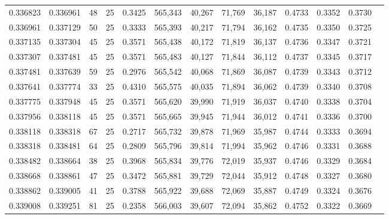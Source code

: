 \begin{tabular}{rrrrrrrrrrrrr}
0.336823 & 0.336961 &    48 &  25 &                                     0.3425 & 565,343 &  40,267 &  71,769 &  36,187 & 0.4733 & 0.3352 & 0.3730 \\
0.336961 & 0.337129 &    50 &  25 &                                     0.3333 & 565,393 &  40,217 &  71,794 &  36,162 & 0.4735 & 0.3350 & 0.3725 \\
0.337135 & 0.337304 &    45 &  25 &                                     0.3571 & 565,438 &  40,172 &  71,819 &  36,137 & 0.4736 & 0.3347 & 0.3721 \\
0.337307 & 0.337481 &    45 &  25 &                                     0.3571 & 565,483 &  40,127 &  71,844 &  36,112 & 0.4737 & 0.3345 & 0.3717 \\
0.337481 & 0.337639 &    59 &  25 &                                     0.2976 & 565,542 &  40,068 &  71,869 &  36,087 & 0.4739 & 0.3343 & 0.3712 \\
0.337641 & 0.337774 &    33 &  25 &                                     0.4310 & 565,575 &  40,035 &  71,894 &  36,062 & 0.4739 & 0.3340 & 0.3708 \\
0.337775 & 0.337948 &    45 &  25 &                                     0.3571 & 565,620 &  39,990 &  71,919 &  36,037 & 0.4740 & 0.3338 & 0.3704 \\
0.337956 & 0.338118 &    45 &  25 &                                     0.3571 & 565,665 &  39,945 &  71,944 &  36,012 & 0.4741 & 0.3336 & 0.3700 \\
0.338118 & 0.338318 &    67 &  25 &                                     0.2717 & 565,732 &  39,878 &  71,969 &  35,987 & 0.4744 & 0.3333 & 0.3694 \\
0.338318 & 0.338481 &    64 &  25 &                                     0.2809 & 565,796 &  39,814 &  71,994 &  35,962 & 0.4746 & 0.3331 & 0.3688 \\
0.338482 & 0.338664 &    38 &  25 &                                     0.3968 & 565,834 &  39,776 &  72,019 &  35,937 & 0.4746 & 0.3329 & 0.3684 \\
0.338668 & 0.338861 &    47 &  25 &                                     0.3472 & 565,881 &  39,729 &  72,044 &  35,912 & 0.4748 & 0.3327 & 0.3680 \\
0.338862 & 0.339005 &    41 &  25 &                                     0.3788 & 565,922 &  39,688 &  72,069 &  35,887 & 0.4749 & 0.3324 & 0.3676 \\
0.339008 & 0.339251 &    81 &  25 &                                     0.2358 & 566,003 &  39,607 &  72,094 &  35,862 & 0.4752 & 0.3322 & 0.3669 \\

\end{tabular}
